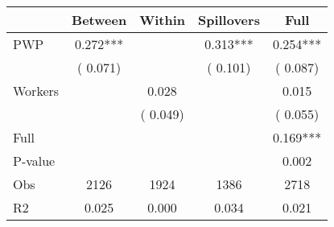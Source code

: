 
\begin{tabular}{l*{4}{c}}\hline&\multicolumn{1}{c}{Between}&\multicolumn{1}{c}{Within}&\multicolumn{1}{c}{Spillovers}&\multicolumn{1}{c}{Full}\\ \hline
 PWP           &              0.272***      &                                               &        0.313*** &         0.254***                            \\ 
                               &        (       0.071)           &                                       &       (       0.101)     &      (       0.087)                                           \\ 
 Workers       &                                               &        0.028    &                                &             0.015                            \\ 
                               &                                               & (       0.049)                  &                                        &      (       0.055)                                           \\ 
\hline                                                                                                                                                                                                                                            
 Full                  &                                               &                                               &                                        &             0.169***                                     \\ 
 P-value               &                                               &                                               &                                        &             0.002                                           \\ 
 Obs                   &               2126               &       1924                       &       1386                &              2718                                               \\ 
 R2                    &                      0.025              &              0.000                      &              0.034               &                     0.021                                              \\ 
\hline \end{tabular}                                                                                                                                                                                                              